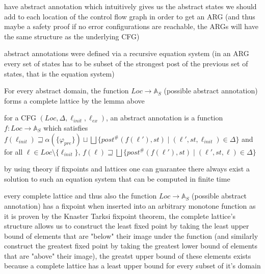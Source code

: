 \documentclass[a4paper]{article}
\begin{document}
\begin{minipage}[t]{0.16\linewidth}
\begin{betterlist}
{{\begin{betterlist}
\begin{betterlist}
					\end{betterlist}
					\item have abstract annotation which intuitively gives us the abstract states we should add to each location of the control flow graph in order to get an ARG (and thus maybe a safety proof if no error configurations are reachable, the ARGs will have the same structure as the underlying CFG)%
					\begin{betterlist}
						\item abstract annotations were defined via a recursive equation system (in an ARG every set of states has to be subset of the strongest post of the previous set of states, that is the equation system)
						\item For every abstract domain, the function $Loc \rightarrow \mathbb{A}_S$ (possible abstract annotation) forms a complete lattice by the lemma above
						\item for a CFG $(Loc, \Delta, \ell_{init}, \ell_{ex})$, an abstract annotation is a function $f: Loc \rightarrow \mathbb{A}_S$ which satisfies $f(\ell_{init}) \sqsupseteq \alpha(\{\varphi_{pre}\}) \sqcup \bigsqcup \{post^\#(f(\ell'), st) \mid (\ell′, st, \ell_{init}) \in \Delta\}$ and for all $\ell \in Loc \setminus \{\ell_{init}\}$, $f(\ell) \sqsupseteq \bigsqcup \{post^\#(f(\ell'), st) \mid (\ell', st, \ell) \in \Delta\}$
					\end{betterlist}
					\item by using theory if fixpoints and lattices one can guarantee there always exist a solution to such an equation system that can be computed in finite time
					\begin{betterlist}
						\item every complete lattice and thus also the function $Loc \rightarrow \mathbb{A}_S$ (possible abstract annotation) has a fixpoint when inserted into an arbitrary monotone function as it is proven by the Knaster Tarksi fixpoint theorem, the complete lattice's structure allows us to construct the least fixed point by taking the least upper bound of elements that are "below" their image under the function (and similarly construct the greatest fixed point by taking the greatest lower bound of elements that are "above" their image), the greatst upper bound of these elements exists because a complete lattice has a least upper bound for every subset of it's domain

\end{betterlist}
\end{betterlist}}}
\end{betterlist}
\end{minipage}
\end{document}
